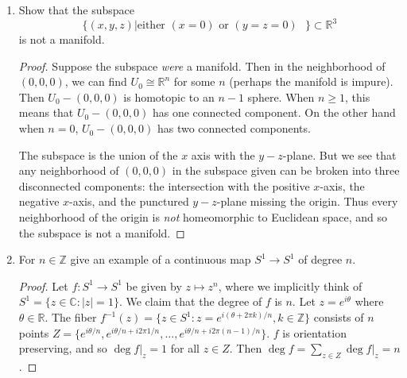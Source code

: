 \documentclass{article}
\begin{document}
\begin{enumerate}
\begin{enumerate}
		
		\item Show that the subspace
		\[ \{(x,y,z) | \text{either $(x=0)$ or $(y=z=0)$ }\} \subset \mathbb{R}^3 \]
		is not a manifold.
		
		\begin{proof}
		Suppose the subspace \emph{were} a manifold. Then in the neighborhood of $(0,0,0)$, we can find $U_0 \cong \mathbb{R}^n$ for some $n$ (perhaps the manifold is impure).
		Then $U_0 - (0,0,0)$ is homotopic to an $n-1$ sphere. When $n \geq 1$, this means that $U_0 - (0,0,0)$ has one connected component.
		On the other hand when $n = 0$, $U_0 - (0,0,0)$ has two connected components.
		
		The subspace is the union of the $x$ axis with the $y-z$-plane.
		But we see that any neighborhood of $(0,0,0)$ in the subspace given can be broken into three disconnected components: 
		the intersection with the positive $x$-axis, the negative $x$-axis, and the punctured $y-z$-plane missing the origin.
		Thus every neighborhood of the origin is \emph{not} homeomorphic to Euclidean space, and so the subspace is not a manifold.
		\end{proof}
		
		\item For $n \in \mathbb{Z}$ give an example of a continuous map $S^1 \rightarrow S^1$ of 
		degree $n$.
	
		\begin{proof}
		Let $f:S^1 \rightarrow S^1$ be given by $z \mapsto z^n$, where we implicitly think of $S^1 = \{ z \in \mathbb{C} : |z|=1 \}$.
		We claim that the degree of $f$ is $n$. 
		Let $z = e^{i \theta}$ where $\theta \in \mathbb{R}$.
		The fiber $f^{-1}(z) = \{ z \in S^1 : z=e^{i(\theta + 2\pi k)/n}, k \in \mathbb{Z}\}$ consists of $n$ points
		$Z = \{ e^{i \theta/n} , e^{i \theta/n + i 2\pi 1/n},..., e^{i \theta/n + i 2\pi (n-1)/n}  \}$.
		$f$ is orientation preserving, and so $\deg f |_{z} = 1$ for all $z \in Z$.
		Then $\deg f = \sum_{z \in Z} \deg f |_{z} = n$. 
		\end{proof}		
		\end{enumerate}
	
\end{enumerate}

%	
%	
%	
\end{document}
